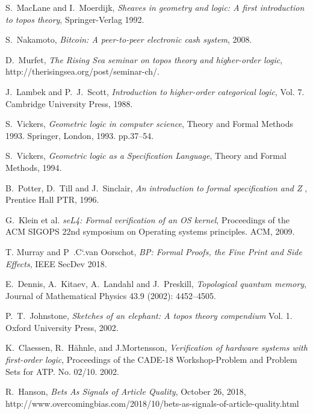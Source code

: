 \documentclass[english,letter paper,12pt,reqno]{article}
\theoremstyle{example}
\begin{document}

\providecommand{\bysame}{\leavevmode\hbox to3em{\hrulefill}\thinspace}
\providecommand{\href}[2]{#2}
\begin{thebibliography}{BHLS03}

S.~MacLane and I.~Moerdijk, \textsl{Sheaves in geometry and logic: A first introduction to topos theory}, Springer-Verlag 1992.

S.~Nakamoto, \textsl{Bitcoin: A peer-to-peer electronic cash system}, 2008.

D.~Murfet, \textsl{The Rising Sea seminar on topos theory and higher-order logic}, http://therisingsea.org/post/seminar-ch/.

J.~Lambek and P.~J.~Scott, \textsl{Introduction to higher-order categorical logic}, Vol. 7. Cambridge University Press, 1988.

S.~Vickers, \textsl{Geometric logic in computer science}, Theory and Formal Methods 1993. Springer, London, 1993. pp.37--54.

S.~Vickers, \textsl{Geometric logic as a Specification Language}, Theory and Formal Methods, 1994.

B.~Potter, D.~Till and J.~Sinclair, \textsl{An introduction to formal specification and Z
}, Prentice Hall PTR, 1996.

G.~Klein et al. \textsl{seL4: Formal verification of an OS kernel}, Proceedings of the ACM SIGOPS 22nd symposium on Operating systems principles. ACM, 2009.

T. Murray and P~.C`.van Oorschot, \textsl{BP: Formal Proofs, the Fine Print and Side Effects}, IEEE SecDev 2018.

E.~Dennis, A.~Kitaev, A.~Landahl and J.~Preskill, \textsl{Topological quantum memory}, Journal of Mathematical Physics 43.9 (2002): 4452--4505.

P.~T.~Johnstone, \textsl{Sketches of an elephant: A topos theory compendium} Vol. 1. Oxford University Press, 2002.

K.~Claessen, R.~H\"ahnle, and J.Mortensson, \textsl{Verification of hardware systems with first-order logic}, Proceedings of the CADE-18 Workshop-Problem and Problem Sets for ATP. No. 02/10. 2002.

R.~Hanson, \textsl{Bets As Signals of Article Quality}, October 26, 2018, http://www.overcomingbias.com/2018/10/bets-as-signals-of-article-quality.html


\end{thebibliography}
\end{document}
